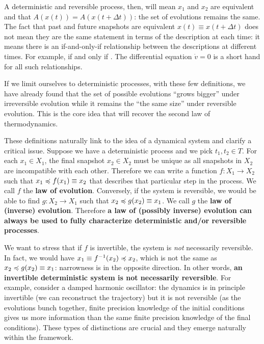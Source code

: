 \documentclass[letterpaper]{article}
\begin{document}
A deterministic and reversible process, then, will mean $x_1$ and $x_2$ are equivalent and that  $A(x(t)) = A(x(t + \Delta t))$: the set of evolutions remains the same. The fact that past and future snapshots are equivalent $x(t) \equiv x(t + \Delta t)$ does not mean they are the same statement in terms of the description at each time: it means there is an if-and-only-if relationship between the descriptions at different times. For example,  if and only if . The differential equation $\dot{v} = 0$ is a short hand for all such relationships.

If we limit ourselves to deterministic processes, with these few definitions, we have already found that the set of possible evolutions ``grows bigger'' under irreversible evolution while it remains the ``the same size'' under reversible evolution. This is the core idea that will recover the second law of thermodynamics.

These definitions naturally link to the idea of a dynamical system and clarify a critical issue. Suppose we have a deterministic process and we pick $t_1, t_2 \in T$. For each $x_1 \in X_1$, the final snapshot $x_2 \in X_2$ must be unique as all snapshots in $X_2$ are incompatible with each other. Therefore we can write a function $f : X_1 \to X_2$ such that $x_1 \preccurlyeq f(x_1) \equiv x_2$ that describes that particular step in the process. We call $f$ the \textbf{law of evolution}. Conversely, if the system is reversible, we would be able to find $g : X_2 \to X_1$ such that $x_2 \preccurlyeq g(x_2) \equiv x_1$.  We call $g$ the \textbf{law of (inverse) evolution}. Therefore \textbf{a law of (possibly inverse) evolution can always be used to fully characterize deterministic and/or reversible processes}.

We want to stress that if $f$ is invertible, the system is \emph{not} necessarily reversible. In fact, we would have $x_1 \equiv f^{-1}(x_2) \preccurlyeq x_2$, which is not the same as $x_2 \preccurlyeq g(x_2) \equiv x_1$: narrowness is in the opposite direction. In other words, \textbf{an invertible deterministic system is not necessarily reversible}. For example, consider a damped harmonic oscillator: the dynamics is in principle invertible (we can reconstruct the trajectory) but it is not reversible (as the evolutions bunch together, finite precision knowledge of the initial conditions gives us more information than the same finite precision knowledge of the final conditions). These types of distinctions are crucial and they emerge naturally within the framework.
\end{document}
